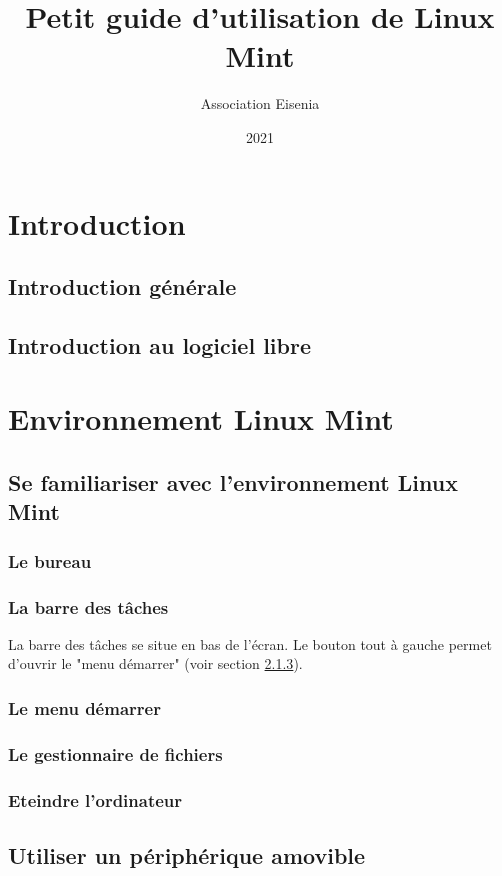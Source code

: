 \documentclass[12pt]{book}
\title{Petit guide d'utilisation de Linux Mint}
\author{Association Eisenia}
\date{2021}
\begin{document}
\maketitle

\newpage
\renewcommand{\contentsname}{Table des matières}
\tableofcontents

\newpage
\renewcommand{\chaptername}{Chapitre}
\chapter{Introduction}
	\section{Introduction générale}
	\section{Introduction au logiciel libre}

\newpage
\chapter{Environnement Linux Mint}
\section{Se familiariser avec l'environnement Linux Mint}
	\subsection{Le bureau}
	\subsection{La barre des tâches}
		La barre des tâches se situe en bas de l'écran.
		Le bouton tout à gauche permet d'ouvrir le "menu démarrer" (voir section \ref{sec:menudemarrer}). 
	\subsection{Le menu démarrer}\label{sec:menudemarrer}
	\subsection{Le gestionnaire de fichiers}
	\subsection{Eteindre l'ordinateur}

\section{Utiliser un périphérique amovible}
\end{document}

